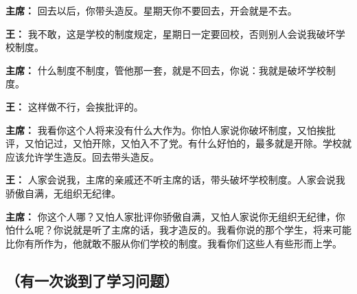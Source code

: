 \begin{duihua}
\item[\textbf{主席：}] 回去以后，你带头造反。星期天你不要回去，开会就是不去。

\item[\textbf{王：}] 我不敢，这是学校的制度规定，星期日一定要回校，否则别人会说我破坏学校制度。

\item[\textbf{主席：}] 什么制度不制度，管他那一套，就是不回去，你说：我就是破坏学校制度。

\item[\textbf{王：}] 这样做不行，会挨批评的。

\item[\textbf{主席：}] 我看你这个人将来没有什么大作为。你怕人家说你破坏制度，又怕挨批评，又怕记过，又怕开除，又怕入不了党。有什么好怕的，最多就是开除。学校就应该允许学生造反。回去带头造反。

\item[\textbf{王：}] 人家会说我，主席的亲戚还不听主席的话，带头破坏学校制度。人家会说我骄傲自满，无组织无纪律。

\item[\textbf{主席：}] 你这个人哪？又怕人家批评你骄傲自满，又怕人家说你无组织无纪律，你怕什么呢？你说就是听了主席的话，我才造反的。我看你说的那个学生，将来可能比你有所作为，他就敢不服从你们学校的制度。我看你们这些人有些形而上学。

\end{duihua}

\subsection{（有一次谈到了学习问题）}

